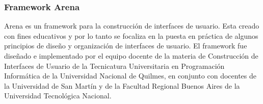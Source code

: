 \subsubsection{Framework Arena}
	Arena es un framework para la construcción de interfaces de usuario. 
	Esta creado con fines educativos y por lo tanto se focaliza en la puesta en
	práctica de algunos principios de diseño y organización de
	interfaces de usuario.
	El framework fue diseñado e implementado por el equipo docente de la materia de
	Construcción de Interfaces de Usuario de la Tecnicatura Universitaria en Programación
	Informática de la Universidad Nacional de Quilmes, en conjunto con docentes de
	la Universidad de San Martín y de la Facultad Regional Buenos Aires de la Universidad Tecnológica Nacional.
	
	